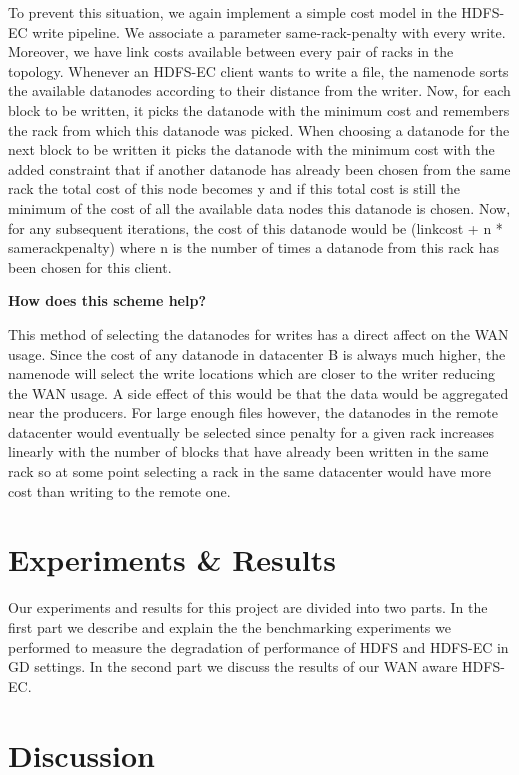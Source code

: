 \documentclass{sig-alternate-05-2015}
\begin{document}
To prevent this situation, we again implement a simple cost model in the HDFS-EC write pipeline. We associate a parameter same-rack-penalty with every write. Moreover, we have link costs available between every pair of racks in the topology. Whenever an HDFS-EC client wants to write a file, the namenode sorts the available datanodes according to their distance from the writer. Now, for each block to be written, it picks the datanode with the minimum cost and remembers the rack from which this datanode was picked. When choosing a datanode for the next block to be written it picks the datanode with the minimum cost with the added constraint that if another datanode has already been chosen from the same rack the total cost of this node becomes y and if this total cost is still the minimum of the cost of all the available data nodes this  datanode is chosen. Now, for any subsequent iterations, the cost of this datanode would be (linkcost + n * samerackpenalty) where n is the number of times a datanode from this rack has been chosen for this client. 

\textbf{How does this scheme help?}

This method of selecting the datanodes for writes has a direct affect on the WAN usage. Since the cost of any datanode in datacenter B is always much higher, the namenode will select the write locations which are closer to the writer reducing the WAN usage. A side effect of this would be that the data would be aggregated near the producers.  For large enough files however, the datanodes in the remote datacenter would eventually be selected since penalty for a given rack increases linearly with the number of blocks that have already been written in the same rack so at some point selecting a rack in the same datacenter would have more cost than writing to the remote one. 

\section{Experiments \& Results}

Our experiments and results for this project are divided into two parts. In the first part we describe and explain the the benchmarking experiments we performed to measure the degradation of performance of HDFS and HDFS-EC in GD settings. In the second part we discuss the results of our WAN aware HDFS-EC. 

\section{Discussion}
\end{document}
